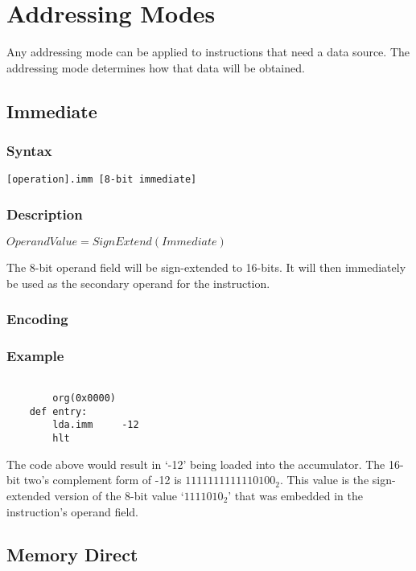 \section{Addressing Modes}\label{subsec:addressing-modes}
\par Any addressing mode can be applied to instructions that need a data source.
The addressing mode determines how that data will be obtained.

\subsection{Immediate}\label{subsec:immediate-(imm)}
\subsubsection{Syntax}
\begin{verbatim}[operation].imm [8-bit immediate]\end{verbatim}

\subsubsection{Description}
$OperandValue = SignExtend(Immediate)$
\par The 8-bit operand field will be sign-extended to 16-bits.
It will then immediately be used as the secondary operand for the instruction.

\subsubsection{Encoding}

\subsubsection{Example}
\begin{verbatim}

        org(0x0000)
    def entry:
        lda.imm     -12
        hlt

\end{verbatim}
The code above would result in `-12' being loaded into the accumulator.
The 16-bit two's complement form of -12 is $1111111111110100_{2}$.
This value is the sign-extended version of the 8-bit value `$1111010_{2}$' that was embedded in the instruction's operand field.
\pagebreak

\subsection{Memory Direct}\label{subsec:memory-direct-(dir)}
